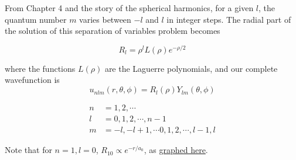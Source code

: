 From Chapter 4 and the story of the spherical harmonics, for a given \(l\), the quantum number \(m\) varies between \(-l\) and \(l\) in integer steps.  The radial part of the solution of this separation of variables problem becomes

\begin{equation}\label{eqn:PHY356FLecture10:320}
R_l = \rho^l L(\rho) e^{-\rho/2}
\end{equation}

where the functions \(L(\rho)\) are the Laguerre polynomials, and our complete wavefunction is
\begin{equation}\label{eqn:PHY356FLecture10:330}
u_{nlm}(r, \theta, \phi) = R_l(\rho) Y_{lm}(\theta, \phi)
\end{equation}

\begin{align}\label{eqn:PHY356FLecture10:340}
n &= 1, 2, \cdots \\
l &= 0, 1, 2, \cdots, n-1 \\
m &= -l, -l+1, \cdots 0, 1, 2, \cdots, l-1, l
\end{align}

Note that for \(n=1, l=0\), \(R_{10} \propto e^{-r/a_0}\), as \href{http://www.wolframalpha.com/input/?i=graph+e^{-r}}{graphed here}.


